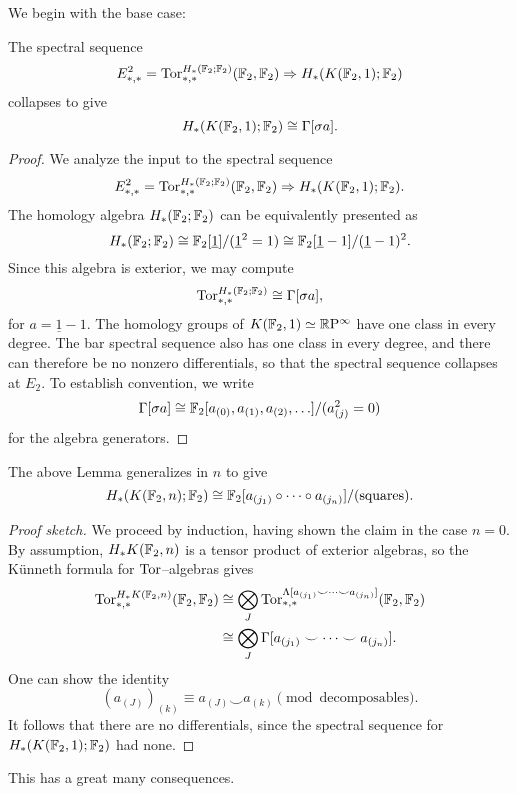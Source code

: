 We begin with the base case:
\begin{lemma}
The spectral sequence \[E_{*, *}^2 = \operatorname{Tor}^{H_*(\mathbb F_2; \mathbb F_2)}_{*, *}(\mathbb F_2, \mathbb F_2) \Rightarrow H_*(K(\mathbb F_2, 1); \mathbb F_2)\] collapses to give \[H_*(K(\mathbb F_2, 1); \mathbb F_2) \cong \Gamma[\sigma a].\]
\end{lemma}
\begin{proof}
We analyze the input to the spectral sequence \[E_{*, *}^2 = \operatorname{Tor}^{H_*(\mathbb F_2; \mathbb F_2)}_{*, *}(\mathbb F_2, \mathbb F_2) \Rightarrow H_*(K(\mathbb F_2, 1); \mathbb F_2).\]
The homology algebra $H_*(\mathbb F_2; \mathbb F_2)$ can be equivalently presented as \[H_*(\mathbb F_2; \mathbb F_2) \cong \mathbb F_2[\underline{1}] / (\underline 1^2 = 1) \cong \mathbb F_2[\underline 1 - 1] / (\underline 1 - 1)^2.\]
Since this algebra is exterior, we may compute \[\operatorname{Tor}^{H_*(\mathbb F_2; \mathbb F_2)}_{*, *} \cong \Gamma[\sigma a],\] for $a = \underline 1 - 1$.
The homology groups of $K(\mathbb F_2, 1) \simeq \mathbb R \mathrm{P}^\infty$ have one class in every degree.
The bar spectral sequence also has one class in every degree, and there can therefore be no nonzero differentials, so that the spectral sequence collapses at $E_2$.
To establish convention, we write \[\Gamma[\sigma a] \cong \mathbb F_2[a_{(0)}, a_{(1)}, a_{(2)}, \ldots] / (a_{(j)}^2 = 0)\] for the algebra generators.
\end{proof}

\begin{theorem}
The above Lemma generalizes in $n$ to give \[H_* (K(\mathbb F_2, n); \mathbb F_2) \cong \mathbb F_2[a_{(j_1)} \circ \cdots \circ a_{(j_n)}] / (\text{squares}).\]
\end{theorem}
\begin{proof}[Proof sketch]
We proceed by induction, having shown the claim in the case $n = 0$.
By assumption, $H_* K(\mathbb F_2, n)$ is a tensor product of exterior algebras, so the K\"unneth formula for $\operatorname{Tor}$--algebras gives
\begin{align*}
\operatorname{Tor}^{H_* K(\mathbb F_2, n)}_{*, *}(\mathbb F_2, \mathbb F_2) & \cong \bigotimes_J \operatorname{Tor}^{\Lambda[a_{(j_1)} \smile \cdots \smile a_{(j_n)}]}_{*, *}(\mathbb F_2, \mathbb F_2) \\
& \cong \bigotimes_J \Gamma[a_{(j_1)} \smile \cdots \smile a_{(j_n)}].
\end{align*}
One can show the identity  \[(a_{(J)})_{(k)} \equiv a_{(J)} \smile a_{(k)} \pmod{\text{decomposables}}.\]
It follows that there are no differentials, since the spectral sequence for $H_*(K(\mathbb F_2, 1); \mathbb F_2)$ had none.
\end{proof}

This has a great many consequences.

